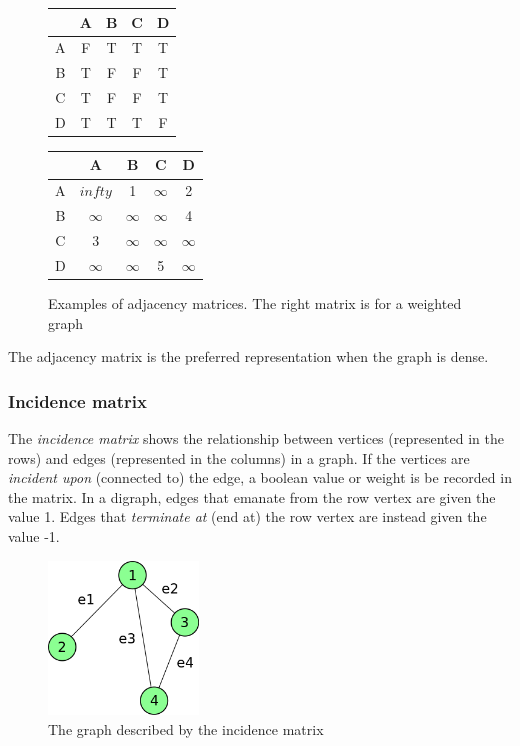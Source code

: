 \documentclass{article}
\begin{document}
\begin{figure}[H]
  \centering
  \begin{tabular}{|c|c|c|c|c|}
    \hline
    \  & A & B & C & D \\ [0.5ex] 
    \hline
    A  & F & T & T & T \\ 
    \hline
    B  & T & F & F & T \\
    \hline
    C  & T & F & F & T \\
    \hline
    D  & T & T & T & F \\
    \hline
  \end{tabular}
  \quad
  \begin{tabular}{|c|c|c|c|c|}
    \hline
    \  & A          & B          & C          & D          \\ [0.5ex] 
    \hline
    A  & \(infty\)  & 1          & \(\infty\) & 2          \\ 
    \hline
    B  & \(\infty\) & \(\infty\) & \(\infty\) & 4          \\
    \hline
    C  & 3          & \(\infty\) & \(\infty\) & \(\infty\) \\
    \hline
    D  & \(\infty\) & \(\infty\) & 5          & \(\infty\) \\
    \hline
  \end{tabular}
  \caption{Examples of adjacency matrices. The right matrix is for a weighted graph}
\end{figure}

The adjacency matrix is the preferred representation when the graph is dense.

\subsubsection{Incidence matrix}
The {\em incidence matrix} shows the relationship between vertices (represented in the rows) and edges (represented in the
columns) in a graph. If the vertices are {\em incident upon} (connected to) the edge, a boolean value or weight is be recorded
in the matrix. In a digraph, edges that emanate from the row vertex are given the value 1. Edges that {\em terminate at} (end
at) the row vertex are instead given the value -1.

\begin{figure}[H]
  \centering
  \includegraphics[width=4cm]{incidence_graph}
  \caption{The graph described by the incidence matrix}
\end{figure}
\end{document}
